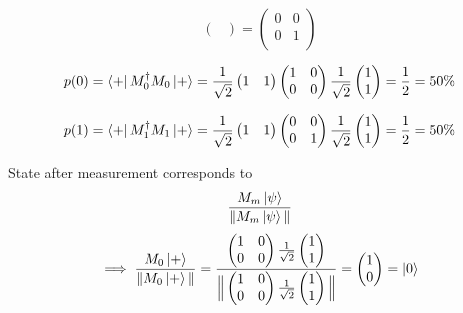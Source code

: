 \documentclass[a4paper, 12pt]{article}
\begin{document}
\begin{flushleft}
\[\begin{pmatrix}
\end{pmatrix} = \begin{pmatrix}
    0 & 0\\
    0 & 1\\
\end{pmatrix}\]

\[p(0)=\bra{+}M_{0}^{\dagger}M_{0}\ket{+} = \frac{1}{\sqrt{2}}\begin{pmatrix}
    1 & 1\\
\end{pmatrix} \begin{pmatrix}
    1 & 0 \\
    0 & 0 \\
\end{pmatrix} \frac{1}{\sqrt{2}} \begin{pmatrix}
    1 \\
    1 \\
\end{pmatrix} = \frac{1}{2} = 50\%\]

\[p(1)=\bra{+}M_{1}^{\dagger}M_{1}\ket{+} = \frac{1}{\sqrt{2}}\begin{pmatrix}
    1 & 1\\
\end{pmatrix} \begin{pmatrix}
    0 & 0 \\
    0 & 1 \\
\end{pmatrix} \frac{1}{\sqrt{2}}\begin{pmatrix}
    1 \\
    1 \\
\end{pmatrix} = \frac{1}{2} = 50\%\]

State after measurement corresponds to \[\frac{M_{m} \ket{\psi}}{\|M_{m} \ket{\psi}\|}\]
\[\implies \frac{M_{0} \ket{+}}{\|M_{0} \ket{+}\|} = \frac{ \begin{pmatrix}
    1 & 0\\
    0 & 0\\
\end{pmatrix} \frac{1}{\sqrt{2}}\begin{pmatrix}
    1 \\
    1 \\
\end{pmatrix}}{\Big\| \begin{pmatrix}
    1 & 0\\
    0 & 0\\
\end{pmatrix} \frac{1}{\sqrt{2}}\begin{pmatrix}
    1 \\
    1 \\
\end{pmatrix}\Big\|}  = \begin{pmatrix}
    1 \\
    0\\
\end{pmatrix} =\ket{0}\]


\end{flushleft}
\end{document}
